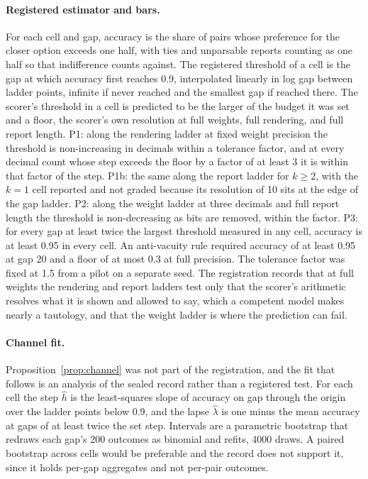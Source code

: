 \documentclass{article}
\theoremstyle{definition}
\theoremstyle{remark}
\begin{document}
\paragraph{Registered estimator and bars.}
For each cell and gap, accuracy is the share of pairs whose preference for the closer option exceeds one half, with ties and unparsable reports counting as one half so that indifference counts against.
The registered threshold of a cell is the gap at which accuracy first reaches 0.9, interpolated linearly in log gap between ladder points, infinite if never reached and the smallest gap if reached there.
The scorer's threshold in a cell is predicted to be the larger of the budget it was set and a floor, the scorer's own resolution at full weights, full rendering, and full report length.
P1: along the rendering ladder at fixed weight precision the threshold is non-increasing in decimals within a tolerance factor, and at every decimal count whose step exceeds the floor by a factor of at least 3 it is within that factor of the step.
P1b: the same along the report ladder for $k\ge2$, with the $k=1$ cell reported and not graded because its resolution of 10 sits at the edge of the gap ladder.
P2: along the weight ladder at three decimals and full report length the threshold is non-decreasing as bits are removed, within the factor.
P3: for every gap at least twice the largest threshold measured in any cell, accuracy is at least 0.95 in every cell.
An anti-vacuity rule required accuracy of at least 0.95 at gap 20 and a floor of at most 0.3 at full precision.
The tolerance factor was fixed at 1.5 from a pilot on a separate seed.
The registration records that at full weights the rendering and report ladders test only that the scorer's arithmetic resolves what it is shown and allowed to say, which a competent model makes nearly a tautology, and that the weight ladder is where the prediction can fail.

\paragraph{Channel fit.}
Proposition~\ref{prop:channel} was not part of the registration, and the fit that follows is an analysis of the sealed record rather than a registered test.
For each cell the step $\hat h$ is the least-squares slope of accuracy on gap through the origin over the ladder points below 0.9, and the lapse $\hat\lambda$ is one minus the mean accuracy at gaps of at least twice the set step.
Intervals are a parametric bootstrap that redraws each gap's 200 outcomes as binomial and refits, 4000 draws.
A paired bootstrap across cells would be preferable and the record does not support it, since it holds per-gap aggregates and not per-pair outcomes.
\end{document}
